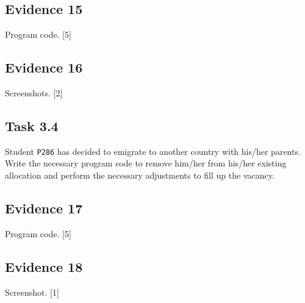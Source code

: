 \subsection*{Evidence 15}

Program code. \hfill{}{[}5{]}

\subsection*{Evidence 16 }

Screenshots. \hfill{}{[}2{]}

\subsection*{Task 3.4}

Student \texttt{P286} has decided to emigrate to another country with
his/her parents. Write the necessary program code to remove him/her
from his/her existing allocation and perform the necessary adjustments
to fill up the vacancy. 

\subsection*{Evidence 17}

Program code. \hfill{}{[}5{]}

\subsection*{Evidence 18 }

Screenshot.\hfill{} {[}1{]}